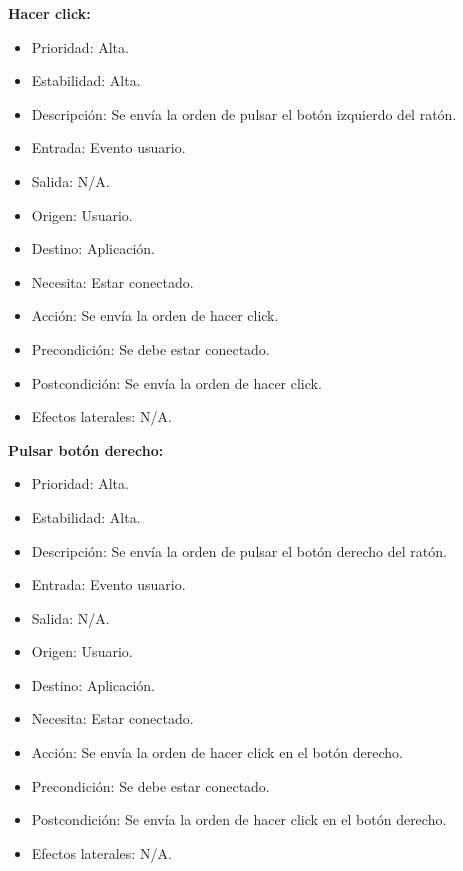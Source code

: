 \textbf{Hacer click:}
\begin{itemize}
\item Prioridad: Alta.
\item Estabilidad: Alta.
\item Descripción: Se envía la orden de pulsar el botón izquierdo del ratón.
\item Entrada: Evento usuario.
\item Salida: N/A.
\item Origen: Usuario.
\item Destino: Aplicación.
\item Necesita: Estar conectado.
\item Acción: Se envía la orden de hacer click.
\item Precondición: Se debe estar conectado.
\item Postcondición: Se envía la orden de hacer click.
\item Efectos laterales: N/A.\\

\end{itemize}
\newpage
\textbf{Pulsar botón derecho:}
\begin{itemize}
\item Prioridad: Alta.
\item Estabilidad: Alta.
\item Descripción: Se envía la orden de pulsar el botón derecho del ratón.
\item Entrada: Evento usuario.
\item Salida: N/A.
\item Origen: Usuario.
\item Destino: Aplicación.
\item Necesita: Estar conectado.
\item Acción: Se envía la orden de hacer click en el botón derecho.
\item Precondición: Se debe estar conectado.
\item Postcondición: Se envía la orden de hacer click en el botón derecho.
\item Efectos laterales: N/A.\\

\end{itemize}

